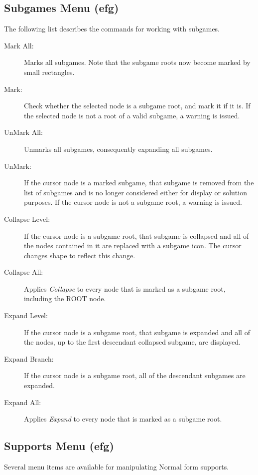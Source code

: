 \subsection{Subgames Menu (efg)}\label{SubgamesMenu}

The following list describes the commands for working with subgames. 

\begin{description}
\item[Mark All:] Marks all subgames.  Note that the subgame roots now
become marked by small rectangles.
\item[Mark:] Check whether the selected node is a subgame root, and mark
it if it is.  If the selected node is not a root of a valid subgame, a
warning is issued.
\item[UnMark All:] Unmarks all subgames, consequently expanding all
subgames.
\item[UnMark:] If the cursor node is a marked subgame, that subgame is
removed from the list of subgames and is no longer considered either
for display or solution purposes.  If the cursor node is not a subgame
root, a warning is issued.
\item[Collapse Level:] If the cursor node is a subgame root, that
subgame is collapsed and all of the nodes contained in it are replaced
with a subgame icon.  The cursor changes shape to reflect this change.
\item[Collapse All:] Applies {\em Collapse} to every node that is
marked as a subgame root, including the ROOT node.
\item[Expand Level:] If the cursor node is a subgame root, that
subgame is expanded and all of the nodes, up to the first descendant
collapsed subgame, are displayed.
\item[Expand Branch:] If the cursor node is a subgame root, all of the
descendant subgames are expanded.
\item[Expand All:] Applies {\em Expand} to every node that is marked
as a subgame root.
\end{description}

\subsection{Supports Menu (efg)}\label{efsupport}

Several menu items are available for manipulating Normal form supports.  

